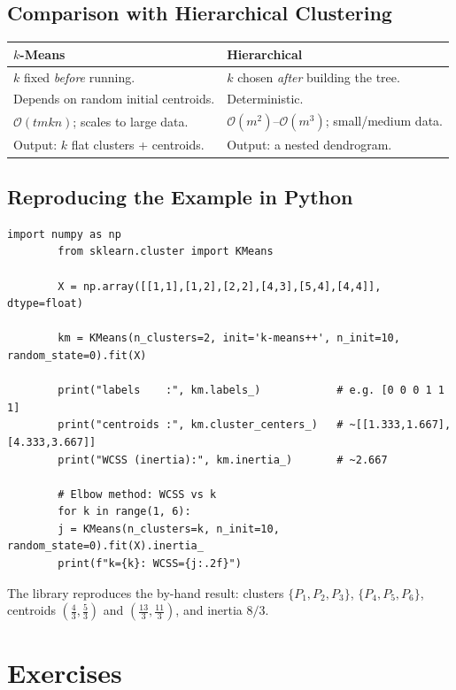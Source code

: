 \documentclass[11pt,a4paper]{report}
\theoremstyle{definition}
\theoremstyle{plain}
\theoremstyle{remark}
\begin{document}
	\section{Comparison with Hierarchical Clustering}
	\begin{center}
		\begin{tabular}{@{}p{6.4cm}p{6.4cm}@{}}
			\toprule
			\textbf{$k$-Means} & \textbf{Hierarchical}\\
			\midrule
			$k$ fixed \emph{before} running. & $k$ chosen \emph{after} building the tree.\\
			Depends on random initial centroids. & Deterministic.\\
			$\mathcal{O}(tmkn)$; scales to large data. &
			$\mathcal{O}(m^2)$--$\mathcal{O}(m^3)$; small/medium data.\\
			Output: $k$ flat clusters + centroids. & Output: a nested dendrogram.\\
			\bottomrule
		\end{tabular}
	\end{center}
	
	\section{Reproducing the Example in Python}
	\begin{lstlisting}[style=python,caption={$k$-means with scikit-learn.}]
		import numpy as np
		from sklearn.cluster import KMeans
		
		X = np.array([[1,1],[1,2],[2,2],[4,3],[5,4],[4,4]], dtype=float)
		
		km = KMeans(n_clusters=2, init='k-means++', n_init=10, random_state=0).fit(X)
		
		print("labels    :", km.labels_)            # e.g. [0 0 0 1 1 1]
		print("centroids :", km.cluster_centers_)   # ~[[1.333,1.667],[4.333,3.667]]
		print("WCSS (inertia):", km.inertia_)       # ~2.667
		
		# Elbow method: WCSS vs k
		for k in range(1, 6):
		j = KMeans(n_clusters=k, n_init=10, random_state=0).fit(X).inertia_
		print(f"k={k}: WCSS={j:.2f}")
	\end{lstlisting}
	The library reproduces the by-hand result: clusters
	$\{P_1,P_2,P_3\}$, $\{P_4,P_5,P_6\}$, centroids
	$(\tfrac43,\tfrac53)$ and $(\tfrac{13}{3},\tfrac{11}{3})$, and inertia $8/3$.
	
	\chapter{Exercises}
	
\end{document}
